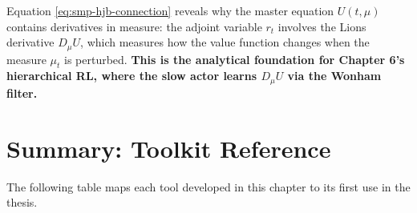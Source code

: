 \begin{remark}
Equation \eqref{eq:smp-hjb-connection} reveals why the master equation $U(t,\mu)$
contains derivatives in measure: the adjoint variable $r_t$ involves the Lions
derivative $D_\mu U$, which measures how the value function changes when the measure
$\mu_t$ is perturbed. \textbf{This is the analytical foundation for Chapter 6's
hierarchical RL, where the slow actor learns $D_\mu U$ via the Wonham filter.}
\end{remark}


\section{Summary: Toolkit Reference}
\label{sec:mp-summary}

The following table maps each tool developed in this chapter to its first use in the
thesis.

